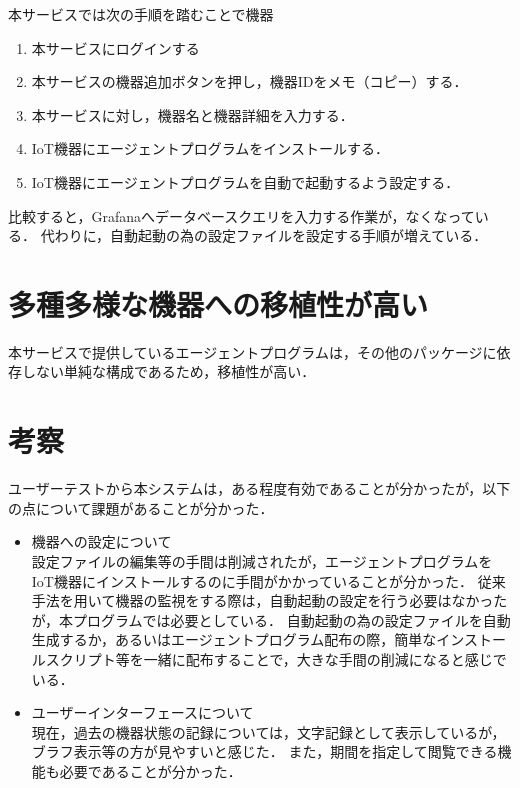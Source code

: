 本サービスでは次の手順を踏むことで機器
\begin{enumerate}
\item 本サービスにログインする
\item 本サービスの機器追加ボタンを押し，機器IDをメモ（コピー）する．
\item 本サービスに対し，機器名と機器詳細を入力する．
\item IoT機器にエージェントプログラムをインストールする．
\item IoT機器にエージェントプログラムを自動で起動するよう設定する．
\end{enumerate}

比較すると，Grafanaへデータベースクエリを入力する作業が，なくなっている．
代わりに，自動起動の為の設定ファイルを設定する手順が増えている．

\section{多種多様な機器への移植性が高い}
本サービスで提供しているエージェントプログラムは，その他のパッケージに依存しない単純な構成であるため，移植性が高い．


\section{考察}
ユーザーテストから本システムは，ある程度有効であることが分かったが，以下の点について課題があることが分かった．
\begin{itemize}
\item 機器への設定について\\
	設定ファイルの編集等の手間は削減されたが，エージェントプログラムをIoT機器にインストールするのに手間がかかっていることが分かった．
	従来手法を用いて機器の監視をする際は，自動起動の設定を行う必要はなかったが，本プログラムでは必要としている．
	自動起動の為の設定ファイルを自動生成するか，あるいはエージェントプログラム配布の際，簡単なインストールスクリプト等を一緒に配布することで，大きな手間の削減になると感じでいる．
\item ユーザーインターフェースについて\\
	現在，過去の機器状態の記録については，文字記録として表示しているが，ブラフ表示等の方が見やすいと感じた．
	また，期間を指定して閲覧できる機能も必要であることが分かった．
\end{itemize}


